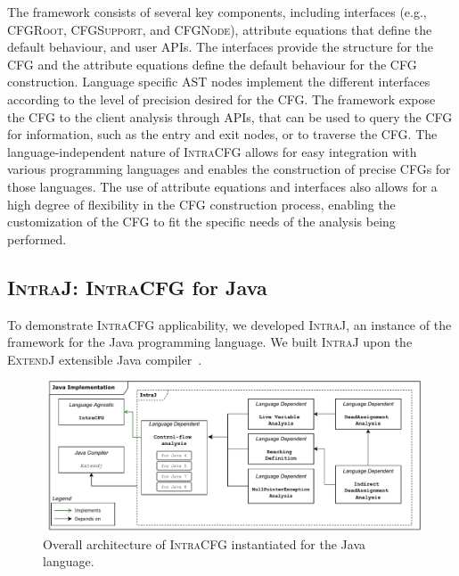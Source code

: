 The framework consists of several key components, including interfaces
(e.g., \textsc{CFGRoot}, \textsc{CFGSupport}, and \textsc{CFGNode}), attribute equations that define the
default behaviour, and user APIs. The interfaces provide the structure for the
CFG and the attribute equations define the default behaviour for the CFG
construction. Language specific AST nodes implement the different interfaces
according to the level of precision desired for the CFG.
The framework expose the CFG to the client analysis through APIs, that can be used
to query the CFG for information, such as the entry and exit nodes, or to traverse the CFG.
The language-independent nature of \textsc{IntraCFG} allows for easy integration
with various programming languages and enables the construction of precise CFGs
for those languages. The use of attribute equations and interfaces also allows
for a high degree of flexibility in the CFG construction process,
enabling the customization of the CFG to fit the specific needs of the
analysis being performed.






\subsection{\textsc{IntraJ}: \textsc{IntraCFG} for Java}
To demonstrate \textsc{IntraCFG} applicability, we developed
\textsc{IntraJ}, an instance of the framework for the Java programming language.
We built \textsc{IntraJ} upon the \textsc{ExtendJ} extensible Java compiler~\cite{DBLP:conf/oopsla/EkmanH07}.
\begin{figure}[H]
    \centering
    \includegraphics[scale=0.52]{kappa/img/architecturejava.pdf}
    \caption{\label{fig:intraJ} Overall architecture of \textsc{IntraCFG} instantiated for the Java language.}
\end{figure}

